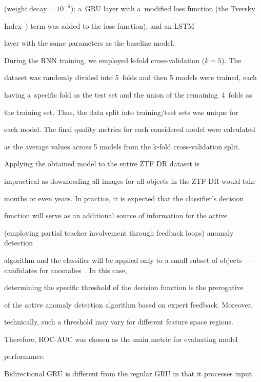 ($\mathrm{weight~decay}=10^{-5}$); a~GRU layer with a~modified loss function (the Tversky 

Index~\cite{salehi2017tversky}) term was added to the loss function); and an LSTM 

layer with the same parameters as the baseline model.



During the RNN training, we employed k-fold cross-validation ($k=5$). The 

dataset was randomly divided into 5~folds and then 5 models were trained, each 

having a~specific fold as the test set and the union of the remaining~4~folds as 

the training set. Thus, the data split into training\!/\!test sets was unique for 

each model. The final quality metrics for each considered model were calculated 

as the average values across 5 models from the k-fold cross-validation split.



Applying the obtained model to the entire ZTF DR dataset is 

impractical as downloading all images for all objects in the ZTF DR would take 

months or even years. In practice, it is expected that the classifier's decision 

function will serve as an additional source of information for the active 

(employing partial teacher involvement through feedback loops) anomaly detection 

algorithm and the classifier will be applied only to a small subset of objects~--- candidates for anomalies~\cite{2021A&A...650A.195I}. In this case, 

determining the specific threshold of the decision function is the prerogative 

of the active anomaly detection algorithm based on expert feedback. Moreover, 

technically, such a threshold may vary for different feature space regions. 

Therefore, ROC-AUC was chosen as the main metric for evaluating model 

performance.







Bidirectional GRU is different from the regular GRU in that it processes input 

